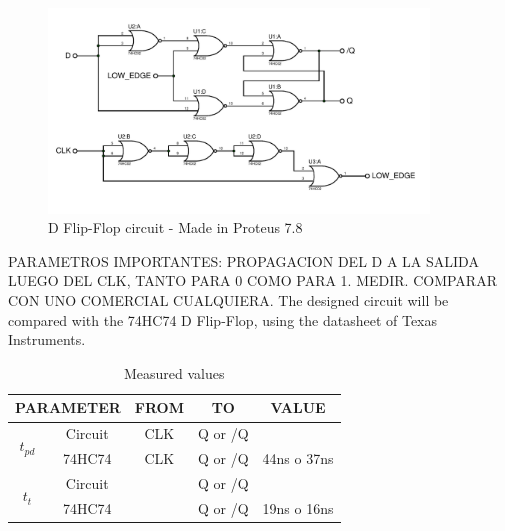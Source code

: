 \begin{figure}[H]
    \begin{centering}
    \includegraphics[width=0.9\textwidth]{data/dflipflop}
    \par\end{centering}
    \caption{D Flip-Flop circuit - Made in Proteus 7.8}
\end{figure}

PARAMETROS IMPORTANTES: PROPAGACION DEL D A
LA SALIDA LUEGO DEL CLK, TANTO PARA 0 COMO
PARA 1. MEDIR. COMPARAR CON UNO COMERCIAL
CUALQUIERA.
The designed circuit will be compared with the 
74HC74 D Flip-Flop, using the datasheet of Texas 
Instruments.

\begin{table}[H]
    \begin{center}
        \begin{tabular}{|c|c|c|c|c|}
            \hline 
            \multicolumn{2}{|c|}{PARAMETER} & FROM & TO & VALUE\tabularnewline
            \hline 
            \hline 
            \multirow{2}{*}{$t_{pd}$} & Circuit & CLK & Q or /Q & \tabularnewline
            \cline{2-5} 
             & 74HC74 & CLK & Q or /Q & 44ns o 37ns\tabularnewline
            \hline 
            \multirow{2}{*}{$t_t$} & Circuit &  & Q or /Q & \tabularnewline
            \cline{2-5} 
             & 74HC74 &  & Q or /Q & 19ns o 16ns\tabularnewline
            \hline 
            \end{tabular}
    \caption{Measured values}
    \end{center}
\end{table}

